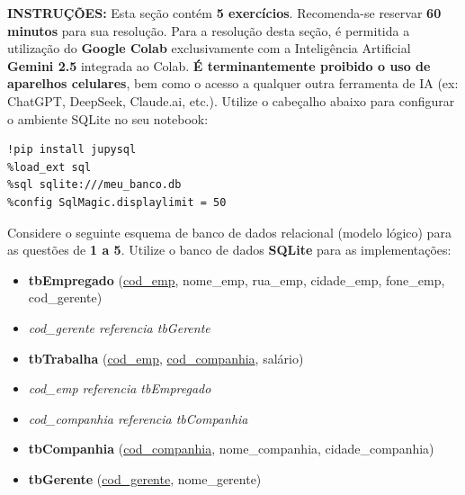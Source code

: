\documentclass[12pt,a4paper]{article}
\begin{document}
\vspace{0.2cm}

\textbf{INSTRUÇÕES:} Esta seção contém \textbf{5 exercícios}. Recomenda-se reservar \textbf{60 minutos} para sua resolução. Para a resolução desta seção, é permitida a utilização do \textbf{Google Colab} exclusivamente com a Inteligência Artificial \textbf{Gemini 2.5} integrada ao Colab. \textbf{É terminantemente proibido o uso de aparelhos celulares}, bem como o acesso a qualquer outra ferramenta de IA (ex: ChatGPT, DeepSeek, Claude.ai, etc.). Utilize o cabeçalho abaixo para configurar o ambiente SQLite no seu notebook:

\begin{verbatim}
!pip install jupysql
%load_ext sql
%sql sqlite:///meu_banco.db
%config SqlMagic.displaylimit = 50
\end{verbatim}

\vspace{0.3cm}

Considere o seguinte esquema de banco de dados relacional (modelo lógico) para as questões de \textbf{1 a 5}. Utilize o banco de dados \textbf{SQLite} para as implementações:

\begin{itemize}[label={}]
    \item \textbf{tbEmpregado} (\underline{cod\_emp}, nome\_emp, rua\_emp, cidade\_emp, fone\_emp, cod\_gerente)
    \item \textit{cod\_gerente referencia tbGerente}
    \item \textbf{tbTrabalha} (\underline{cod\_emp}, \underline{cod\_companhia}, salário)
    \item \textit{cod\_emp referencia tbEmpregado}
    \item \textit{cod\_companhia referencia tbCompanhia}
    \item \textbf{tbCompanhia} (\underline{cod\_companhia}, nome\_companhia, cidade\_companhia)
    \item \textbf{tbGerente} (\underline{cod\_gerente}, nome\_gerente)
\end{itemize}

\vspace{0.3cm}
\end{document}
